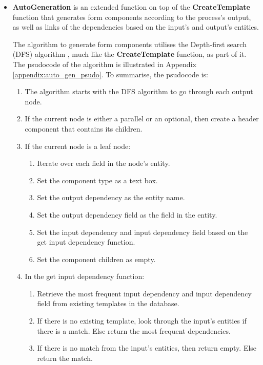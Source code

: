 \begin{itemize}
    \item \textbf{AutoGeneration} is an extended function on top of the \textbf{CreateTemplate} function that generates form components according to the process's output, as well as links of the dependencies based on the input's and output's entities.
    
    The algorithm to generate form components utilises the Depth-first search (DFS) algorithm \cite{dfs}, much like the \textbf{CreateTemplate} function, as part of it. The psudocode of the algorithm is illustrated in Appendix \ref{appendix:auto_gen_psudo}. To summarise, the psudocode is:
    
    \begin{enumerate}
        \item The algorithm starts with the DFS algorithm to go through each output node.
        \item If the current node is either a parallel or an optional, then create a header component that contains its children.
        \item If the current node is a leaf node:
        \begin{enumerate}
            \item Iterate over each field in the node's entity.
            \item Set the component type as a text box.
            \item Set the output dependency as the entity name.
            \item Set the output dependency field as the field in the entity.
            \item Set the input dependency and input dependency field based on the get input dependency function.
            \item Set the component children as empty.
        \end{enumerate}
        \item In the get input dependency function:
        \begin{enumerate}
            \item Retrieve the most frequent input dependency and input dependency field from existing templates in the database.
            \item If there is no existing template, look through the input's entities if there is a match. Else return the most frequent dependencies.
            \item If there is no match from the input's entities, then return empty. Else return the match.
        \end{enumerate}
    \end{enumerate}
    

\end{itemize}
